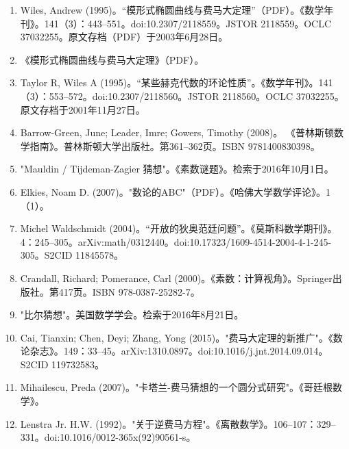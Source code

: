 \begin{enumerate}
\item Wiles, Andrew (1995)。“模形式椭圆曲线与费马大定理”（PDF）。《数学年刊》。141（3）：443–551。doi:10.2307/2118559。JSTOR 2118559。OCLC 37032255。原文存档（PDF）于2003年6月28日。  
\item 《模形式椭圆曲线与费马大定理》（PDF）。  
\item Taylor R, Wiles A (1995)。“某些赫克代数的环论性质”。《数学年刊》。141（3）：553–572。doi:10.2307/2118560。JSTOR 2118560。OCLC 37032255。原文存档于2001年11月27日。
\item Barrow-Green, June; Leader, Imre; Gowers, Timothy (2008)。 《普林斯顿数学指南》。普林斯顿大学出版社。第361–362页。ISBN 9781400830398。  
\item "Mauldin / Tijdeman-Zagier 猜想"。《素数谜题》。检索于2016年10月1日。  
\item Elkies, Noam D. (2007)。"数论的ABC"（PDF）。《哈佛大学数学评论》。1（1）。  
\item Michel Waldschmidt (2004)。“开放的狄奥范廷问题”。《莫斯科数学期刊》。4：245–305。arXiv:math/0312440。doi:10.17323/1609-4514-2004-4-1-245-305。S2CID 11845578。  
\item Crandall, Richard; Pomerance, Carl (2000)。《素数：计算视角》。Springer出版社。第417页。ISBN 978-0387-25282-7。  
\item "比尔猜想"。美国数学学会。检索于2016年8月21日。  
\item Cai, Tianxin; Chen, Deyi; Zhang, Yong (2015)。"费马大定理的新推广"。《数论杂志》。149：33–45。arXiv:1310.0897。doi:10.1016/j.jnt.2014.09.014。S2CID 119732583。  
\item Mihailescu, Preda (2007)。"卡塔兰-费马猜想的一个圆分式研究"。《哥廷根数学》。  
\item Lenstra Jr. H.W. (1992)。"关于逆费马方程"。《离散数学》。106–107：329–331。doi:10.1016/0012-365x(92)90561-s。


\end{enumerate}
